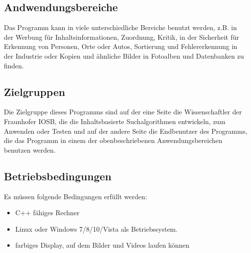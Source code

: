 \subsection{Andwendungsbereiche}


Das Programm kann in viele unterschiedliche Bereiche benutzt werden, z.B. in der Werbung für Inhaltsinformationen, Zuordnung, Kritik,  in der Sicherheit für Erkennung von Personen, Orte oder Autos, Sortierung und Fehlererkennung in der Industrie oder Kopien und ähnliche Bilder in Fotoalben und Datenbanken zu finden.

\subsection{Zielgruppen}

Die Zielgruppe dieses Programms sind auf der eine Seite die Wissenschaftler der Fraunhofer IOSB, die die Inhaltsbasierte Suchalgorithmen entwickeln, zum Anwenden oder Testen und auf der andere Seite die Endbenutzer des Programms, die das Programm in einem der obenbeschriebenen Anwendungsbereichen benutzen werden.
 
\subsection{Betriebsbedingungen}

Es müssen folgende Bedingungen erfüllt werden:

\begin{itemize}

\item C++ fähiges Rechner
\item Linux oder Windows 7/8/10/Vista als Betriebssystem.
\item farbiges Display, auf dem Bilder und Videos laufen können 

\end{itemize}
